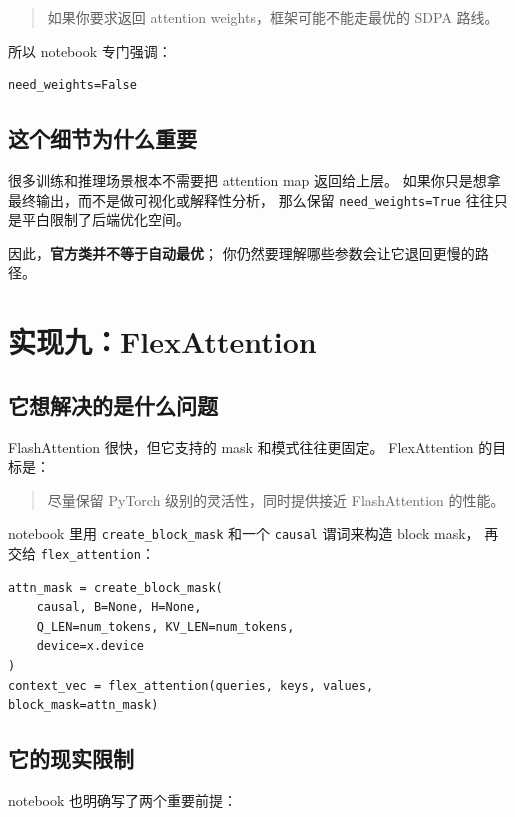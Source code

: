 \documentclass[12pt,a4paper]{ctexart}
\newcommand{\code}[1]{\texttt{#1}}
\begin{document}
\begin{quote}
如果你要求返回 attention weights，框架可能不能走最优的 SDPA 路线。
\end{quote}

所以 notebook 专门强调：

\begin{lstlisting}[style=py]
need_weights=False
\end{lstlisting}

\subsection{这个细节为什么重要}

很多训练和推理场景根本不需要把 attention map 返回给上层。
如果你只是想拿最终输出，而不是做可视化或解释性分析，
那么保留 \code{need\_weights=True} 往往只是平白限制了后端优化空间。

因此，\textbf{官方类并不等于自动最优}；
你仍然要理解哪些参数会让它退回更慢的路径。

\section{实现九：FlexAttention}

\subsection{它想解决的是什么问题}

FlashAttention 很快，但它支持的 mask 和模式往往更固定。
FlexAttention 的目标是：

\begin{quote}
尽量保留 PyTorch 级别的灵活性，同时提供接近 FlashAttention 的性能。
\end{quote}

notebook 里用 \code{create\_block\_mask} 和一个 \code{causal} 谓词来构造 block mask，
再交给 \code{flex\_attention}：

\begin{lstlisting}[style=py]
attn_mask = create_block_mask(
    causal, B=None, H=None,
    Q_LEN=num_tokens, KV_LEN=num_tokens,
    device=x.device
)
context_vec = flex_attention(queries, keys, values, block_mask=attn_mask)
\end{lstlisting}

\subsection{它的现实限制}

notebook 也明确写了两个重要前提：
\end{document}
